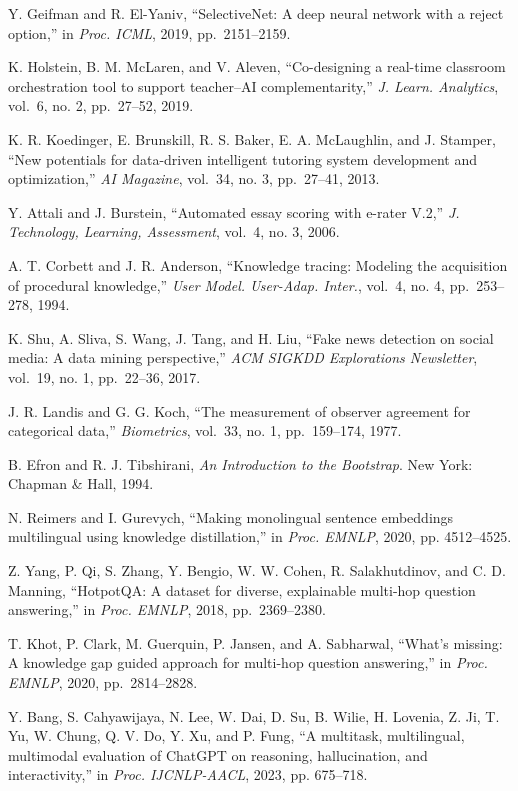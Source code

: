Y. Geifman and R. El-Yaniv, ``SelectiveNet: A deep neural network with a reject option,'' in \emph{Proc. ICML}, 2019, pp.~2151--2159.

K. Holstein, B. M. McLaren, and V. Aleven, ``Co-designing a real-time classroom orchestration tool to support teacher--AI complementarity,'' \emph{J. Learn. Analytics}, vol.~6, no. 2, pp.~27--52, 2019.

K. R. Koedinger, E. Brunskill, R. S. Baker, E. A. McLaughlin, and J. Stamper, ``New potentials for data-driven intelligent tutoring system development and optimization,'' \emph{AI Magazine}, vol.~34, no. 3, pp.~27--41, 2013.

Y. Attali and J. Burstein, ``Automated essay scoring with e-rater V.2,'' \emph{J. Technology, Learning, Assessment}, vol.~4, no. 3, 2006.

A. T. Corbett and J. R. Anderson, ``Knowledge tracing: Modeling the acquisition of procedural knowledge,'' \emph{User Model. User-Adap. Inter.}, vol.~4, no. 4, pp.~253--278, 1994.

K. Shu, A. Sliva, S. Wang, J. Tang, and H. Liu, ``Fake news detection on social media: A data mining perspective,'' \emph{ACM SIGKDD Explorations Newsletter}, vol.~19, no. 1, pp.~22--36, 2017.

J. R. Landis and G. G. Koch, ``The measurement of observer agreement for categorical data,'' \emph{Biometrics}, vol.~33, no. 1, pp.~159--174, 1977.

B. Efron and R. J. Tibshirani, \emph{An Introduction to the Bootstrap}. New York: Chapman \& Hall, 1994.

N. Reimers and I. Gurevych, ``Making monolingual sentence embeddings multilingual using knowledge distillation,'' in \emph{Proc. EMNLP}, 2020, pp. 4512--4525.

Z. Yang, P. Qi, S. Zhang, Y. Bengio, W. W. Cohen, R. Salakhutdinov, and C. D. Manning, ``HotpotQA: A dataset for diverse, explainable multi-hop question answering,'' in \emph{Proc. EMNLP}, 2018, pp.~2369--2380.

T. Khot, P. Clark, M. Guerquin, P. Jansen, and A. Sabharwal, ``What's missing: A knowledge gap guided approach for multi-hop question answering,'' in \emph{Proc. EMNLP}, 2020, pp.~2814--2828.

Y. Bang, S. Cahyawijaya, N. Lee, W. Dai, D. Su, B. Wilie, H. Lovenia, Z. Ji, T. Yu, W. Chung, Q. V. Do, Y. Xu, and P. Fung, ``A multitask, multilingual, multimodal evaluation of ChatGPT on reasoning, hallucination, and interactivity,'' in \emph{Proc. IJCNLP-AACL}, 2023, pp. 675--718.

